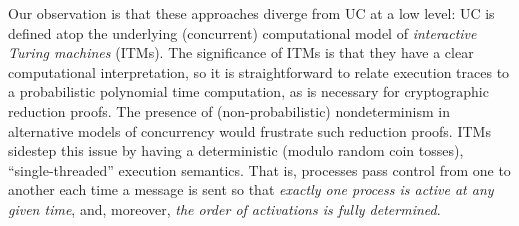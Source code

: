 Our observation is that these approaches diverge from UC at a low level: UC is
defined atop the underlying (concurrent) computational model of
\emph{interactive Turing machines} (ITMs).
%
%
The significance of ITMs is that they have a clear computational interpretation,
so it is straightforward to relate execution traces to a probabilistic
polynomial time computation, as is necessary for cryptographic reduction proofs.
%
The presence of (non-probabilistic) nondeterminism in alternative models of
concurrency would frustrate such reduction proofs.  ITMs sidestep this issue by
having a deterministic (modulo random coin tosses), ``single-threaded''
execution semantics. That is, processes pass control from one to another each
time a message is sent so that \emph{exactly one process is active at any given
  time}, and, moreover, \emph{the order of activations is fully determined}.


